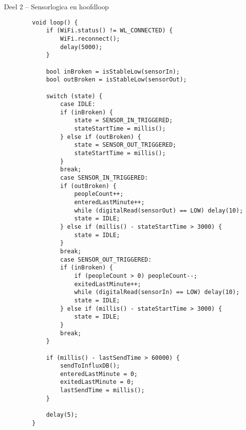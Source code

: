 \documentclass[dutch,dit,thesis]{hogentreport}
\begin{document}
\begin{listing}[H]
    \caption{Deel 2 – Sensorlogica en hoofdloop}
    \label{lst:esp32_loop}
    \begin{verbatim}
        void loop() {
            if (WiFi.status() != WL_CONNECTED) {
                WiFi.reconnect();
                delay(5000);
            }
            
            bool inBroken = isStableLow(sensorIn);
            bool outBroken = isStableLow(sensorOut);
            
            switch (state) {
                case IDLE:
                if (inBroken) {
                    state = SENSOR_IN_TRIGGERED;
                    stateStartTime = millis();
                } else if (outBroken) {
                    state = SENSOR_OUT_TRIGGERED;
                    stateStartTime = millis();
                }
                break;
                case SENSOR_IN_TRIGGERED:
                if (outBroken) {
                    peopleCount++;
                    enteredLastMinute++;
                    while (digitalRead(sensorOut) == LOW) delay(10);
                    state = IDLE;
                } else if (millis() - stateStartTime > 3000) {
                    state = IDLE;
                }
                break;
                case SENSOR_OUT_TRIGGERED:
                if (inBroken) {
                    if (peopleCount > 0) peopleCount--;
                    exitedLastMinute++;
                    while (digitalRead(sensorIn) == LOW) delay(10);
                    state = IDLE;
                } else if (millis() - stateStartTime > 3000) {
                    state = IDLE;
                }
                break;
            }
            
            if (millis() - lastSendTime > 60000) {
                sendToInfluxDB();
                enteredLastMinute = 0;
                exitedLastMinute = 0;
                lastSendTime = millis();
            }
            
            delay(5);
        }
    \end{verbatim}
\end{listing}
\end{document}
